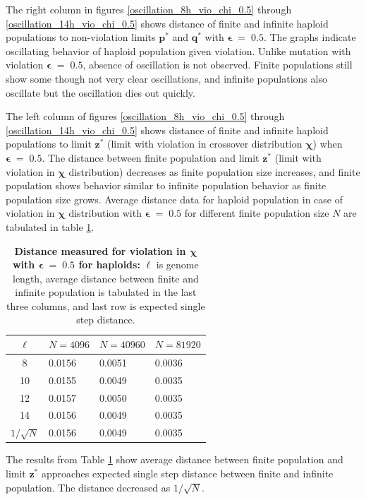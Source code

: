 \clearpage

The right column in figures \ref{oscillation_8h_vio_chi_0.5} through \ref{oscillation_14h_vio_chi_0.5} 
shows distance of finite and infinite haploid populations to non-violation limits $\bm{p^\ast}$ and $\bm{q^\ast}$ with $\bm{\epsilon} \;=\; 0.5$. 
The graphs indicate oscillating behavior of haploid population given violation. 
Unlike mutation with violation $\bm{\epsilon} \;=\; 0.5$, absence of oscillation is not observed. 
Finite populations still show some though not very clear oscillations, and infinite populations 
also oscillate but the oscillation dies out quickly. 

The left column of figures \ref{oscillation_8h_vio_chi_0.5} through \ref{oscillation_14h_vio_chi_0.5} 
shows distance of finite and infinite haploid populations to limit $\bm{z^\ast}$ 
(limit with violation in crossover distribution $\bm{\chi}$) when $\bm{\epsilon} \;=\; 0.5$. 
The distance between finite population and limit $\bm{z}^\ast$ (limit with violation in $\bm{\chi}$ distribution) 
decreases as finite population size increases, 
and finite population shows behavior similar to infinite population behavior as finite population size grows. 
Average distance data for haploid population in case of violation in $\bm{\chi}$ distribution 
with $\bm{\epsilon} \;=\; 0.5$ for different finite population size $N$ are tabulated in table \ref{distanceChiHapEps0.5}. 

\begin{table}[ht]
\caption[\textbf{Distance measured for violation in $\bm{\chi}$ with $\bm{\epsilon} \;=\; 0.5$  for haploids}]{\textbf{Distance measured for violation in $\bm{\chi}$ with $\bm{\epsilon} \;=\; 0.5$  for haploids:} $\ell$ is genome length, 
average distance between finite and infinite population is tabulated in the last three columns, and last row is expected single step distance.}
\centering
\begin{tabularx}{0.75\textwidth}{ c *{3}{X}}
\toprule
$\ell$ & $N = 4096$ & $N = 40960$ & $N = 81920$  \\
\midrule
8 & 0.0156	&  0.0051	& 0.0036 \\
10 & 0.0155	&  0.0049	& 0.0035 \\
12 & 0.0157	&  0.0050	& 0.0035 \\
14 & 0.0156	&  0.0049	& 0.0035 \\      
\midrule
$1/\sqrt{N}$ & 0.0156 & 0.0049 & 0.0035 \\
\bottomrule
\end{tabularx}
\label{distanceChiHapEps0.5}
\end{table} 

The results from Table \ref{distanceChiHapEps0.5} show average distance 
between finite population and limit $\bm{z^\ast}$ approaches expected single step distance 
between finite and infinite population. The distance decreased as $1/\sqrt{N}$. 








